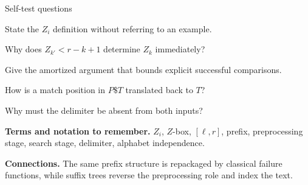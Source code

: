 \documentclass[11pt,letterpaper]{article}
\begin{document}
\begin{CornellExamBox}{Self-test questions}
\begin{CornellRecallList}
  \item State the $Z_i$ definition without referring to an example.
  \item Why does $Z_{k'}<r-k+1$ determine $Z_k$ immediately?
  \item Give the amortized argument that bounds explicit successful comparisons.
  \item How is a match position in $P\$T$ translated back to $T$?
  \item Why must the delimiter be absent from both inputs?
\end{CornellRecallList}
\end{CornellExamBox}

{\footnotesize
\textbf{Terms and notation to remember.} $Z_i$, $Z$-box, $[\ell,r]$, prefix, preprocessing stage, search stage, delimiter, alphabet independence.

\textbf{Connections.} The same prefix structure is repackaged by classical failure functions, while suffix trees reverse the preprocessing role and index the text.
}
\end{document}
